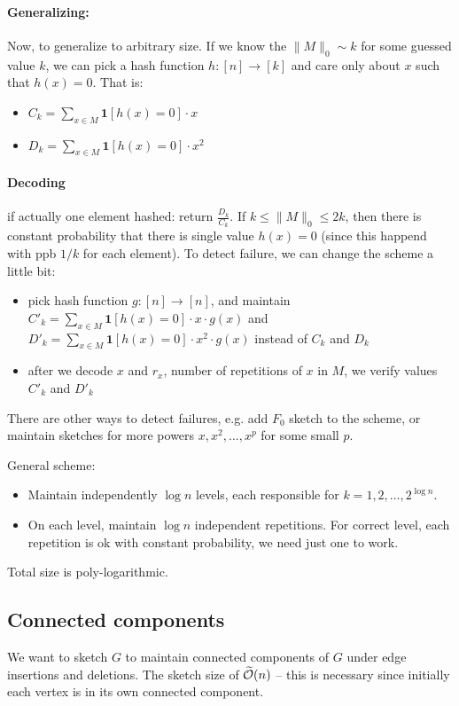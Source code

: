 \documentclass[11pt]{article}
\begin{document}
\paragraph{Generalizing:} Now, to generalize to arbitrary size. If we know the $\|M\|_0 \sim k$ for some guessed value $k$, we can pick a hash function $h : [n] \to [k]$ and care only about $x$ such that $h(x) = 0$. That is:
\begin{itemize}
\item $C_k = \sum_{x \in M} \mathbf{1}[h(x) = 0] \cdot x$
\item $D_k = \sum_{x \in M} \mathbf{1}[h(x) = 0] \cdot x^2$
\end{itemize}
\paragraph{Decoding} if actually one element hashed: return $\frac{D_k}{C_k}$.  If $k \le \|M\|_0 \le 2k$, then there is constant probability that there is single value $h(x) = 0$ (since this happend with ppb $1/k$ for each element). 
To detect failure, we can change the scheme a little bit: 
\begin{itemize}
\item pick hash function $g : [n] \to [n]$, and maintain $C'_k = \sum_{x \in M} \mathbf{1}[h(x) = 0] \cdot x \cdot g(x)$ and $D'_k = \sum_{x \in M} \mathbf{1}[h(x) = 0] \cdot x^2 \cdot g(x)$ instead of $C_k$ and $D_k$
\item after we decode $x$ and $r_x$, number of repetitions of $x$ in $M$, we verify values $C'_k$ and $D'_k$
\end{itemize}
There are other ways to detect failures, e.g. add $F_0$ sketch to the scheme, or maintain sketches for more powers $x,x^2,\ldots,x^p$ for some small $p$.

General scheme:
\begin{itemize}
\item Maintain independently $\log n$ levels, each responsible for $k=1,2,\ldots,2^{\log n}$.
\item On each level, maintain $\log n$ independent repetitions. For correct level, each repetition is ok with constant probability, we need just one to work.
\end{itemize}
Total size is poly-logarithmic.

\subsection{Connected components}
We want to sketch $G$ to maintain connected components of $G$ under edge insertions and deletions. The sketch size of $\widetilde{\mathcal{O}}(n)$ -- this is necessary since initially each vertex is in its own connected component.
\end{document}
